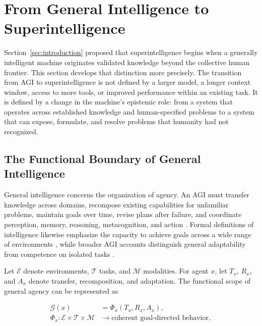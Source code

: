 \section{\textbf{From General Intelligence to Superintelligence}}
\label{sec:agi_to_si}

Section~\ref{sec:introduction} proposed that superintelligence begins when a
generally intelligent machine originates validated knowledge beyond the
collective human frontier. This section develops that distinction more
precisely. The transition from AGI to superintelligence is not defined by a
larger model, a longer context window, access to more tools, or improved
performance within an existing task. It is defined by a change in the machine's
epistemic role: from a system that operates across established knowledge and
human-specified problems to a system that can expose, formulate, and resolve
problems that humanity had not recognized.

\subsection{\textbf{The Functional Boundary of General Intelligence}}

General intelligence concerns the organization of agency. An AGI must transfer
knowledge across domains, recompose existing capabilities for unfamiliar
problems, maintain goals over time, revise plans after failure, and coordinate
perception, memory, reasoning, metacognition, and action
\cite{zohourian2026agi}. Formal definitions of intelligence likewise emphasize
the capacity to achieve goals across a wide range of environments
\cite{legg2007universal}, while broader AGI accounts distinguish general
adaptability from competence on isolated tasks \cite{goertzel2014agi}.

Let $\mathcal{E}$ denote environments, $\mathcal{T}$ tasks, and $\mathcal{M}$
modalities. For agent $x$, let $T_x$, $R_x$, and $A_x$ denote transfer,
recomposition, and adaptation. The functional scope of general agency can be
represented as

\begin{equation}
\begin{aligned}
\mathcal{G}(x)
&= \Phi_x(T_x,R_x,A_x),\\
\Phi_x:
\mathcal{E}\times\mathcal{T}\times\mathcal{M}
&\longrightarrow
\text{coherent goal-directed behavior},
\end{aligned}
\label{eq:general_agency}
\end{equation}

